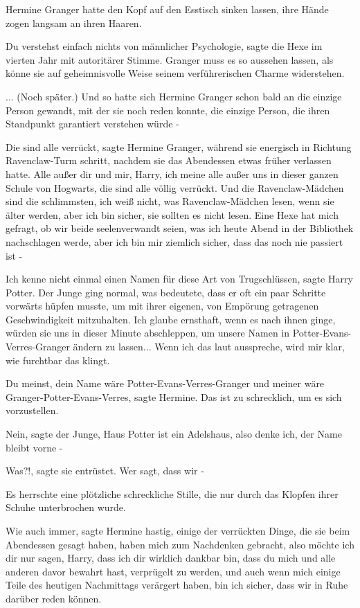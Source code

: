 Hermine Granger hatte den Kopf auf den Esstisch sinken lassen, ihre Hände zogen
langsam an ihren Haaren.

\glqq Du verstehst einfach nichts von männlicher Psychologie\grqq{}, sagte die
Hexe im vierten Jahr mit autoritärer Stimme. \glqq Granger muss es so aussehen
lassen, als könne sie auf geheimnisvolle Weise seinem verführerischen Charme
widerstehen.\grqq{}

... (Noch später.) Und so hatte sich Hermine Granger schon bald an die einzige
Person gewandt, mit der sie noch reden konnte, die einzige Person, die ihren
Standpunkt garantiert verstehen würde -

\glqq Die sind alle verrückt\grqq{}, sagte Hermine Granger, während sie
energisch in Richtung Ravenclaw-Turm schritt, nachdem sie das Abendessen etwas
früher verlassen hatte. \glqq Alle außer dir und mir, Harry, ich meine alle
außer uns in dieser ganzen Schule von Hogwarts, die sind alle völlig verrückt.
Und die Ravenclaw-Mädchen sind die schlimmsten, ich weiß nicht, was
Ravenclaw-Mädchen lesen, wenn sie älter werden, aber ich bin sicher, sie sollten
es nicht lesen. Eine Hexe hat mich gefragt, ob wir beide seelenverwandt seien,
was ich heute Abend in der Bibliothek nachschlagen werde, aber ich bin mir
ziemlich sicher, dass das noch nie passiert ist -\grqq{}

\glqq Ich kenne nicht einmal einen Namen für diese Art von Trugschlüssen\grqq{},
sagte Harry Potter. Der Junge ging normal, was bedeutete, dass er oft ein paar
Schritte vorwärts hüpfen musste, um mit ihrer eigenen, von Empörung getragenen
Geschwindigkeit mitzuhalten. \glqq Ich glaube ernsthaft, wenn es nach ihnen
ginge, würden sie uns in dieser Minute abschleppen, um unsere Namen in
Potter-Evans-Verres-Granger ändern zu lassen... Wenn ich das laut ausspreche,
wird mir klar, wie furchtbar das klingt.\grqq{}

\glqq Du meinst, dein Name wäre Potter-Evans-Verres-Granger und meiner wäre
Granger-Potter-Evans-Verres\grqq{}, sagte Hermine. \glqq Das ist zu schrecklich,
um es sich vorzustellen.\grqq{}

\glqq Nein\grqq{}, sagte der Junge, \glqq Haus Potter ist ein Adelshaus, also
denke ich, der Name bleibt vorne -\grqq{}

\glqq Was?!\grqq{}, sagte sie entrüstet. \glqq Wer sagt, dass wir -\grqq{}

Es herrschte eine plötzliche schreckliche Stille, die nur durch das Klopfen
ihrer Schuhe unterbrochen wurde.

\glqq Wie auch immer\grqq{}, sagte Hermine hastig, \glqq einige der verrückten
Dinge, die sie beim Abendessen gesagt haben, haben mich zum Nachdenken gebracht,
also möchte ich dir nur sagen, Harry, dass ich dir wirklich dankbar bin, dass du
mich und alle anderen davor bewahrt hast, verprügelt zu werden, und auch wenn
mich einige Teile des heutigen Nachmittags verärgert haben, bin ich sicher, dass
wir in Ruhe darüber reden können.\grqq{}

